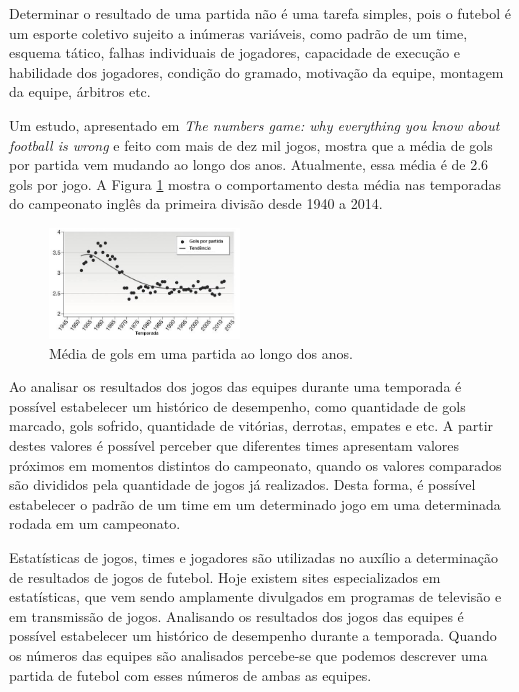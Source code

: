 \documentclass{article}
\begin{document}
Determinar o resultado de uma partida não é uma tarefa
simples, pois o futebol é um esporte coletivo sujeito a inúmeras
variáveis, como padrão de um time, esquema tático, falhas
individuais de jogadores, capacidade de execução e habilidade
dos jogadores, condição do gramado, motivação da equipe,
montagem da equipe, árbitros  etc. 

Um estudo, apresentado em \textit{ The numbers game: why
everything you know about football is wrong} \cite{anderson2013numbers} e feito com
mais de dez mil jogos, mostra que a média de gols por partida
vem mudando ao longo dos anos. Atualmente, essa média é
de 2.6 gols por jogo. A Figura \ref{fig:gols_ingles} mostra o comportamento desta média nas temporadas do campeonato inglês da primeira divisão desde 1940 a 2014.

\begin{figure}[!h]
	\centering
	\includegraphics[width=0.45\textwidth]{./04-figuras/ingles_gols_2.png}
	\caption{Média de gols em uma partida ao longo dos anos.}
	\label{fig:gols_ingles}
\end{figure}





Ao analisar os resultados dos jogos das equipes durante
uma temporada é possível estabelecer um histórico de desempenho, como quantidade de gols marcado, gols sofrido, quantidade de vitórias, derrotas, empates e etc. A partir destes valores é possível perceber que diferentes times apresentam valores próximos em momentos distintos do campeonato, quando os valores comparados são divididos pela quantidade de jogos já realizados. Desta forma, é possível estabelecer o padrão de um
time em um determinado jogo em uma determinada rodada em
um campeonato.

Estatísticas de jogos, times e jogadores são utilizadas no auxílio a determinação
de resultados de jogos de futebol. Hoje existem sites especializados em estatísticas,
que vem sendo amplamente divulgados em programas de televisão e em transmissão
de jogos. Analisando os resultados dos jogos das equipes é possível estabelecer um
histórico de desempenho durante a temporada. Quando os números das equipes são analisados percebe-se que podemos descrever uma partida de futebol com esses números de ambas as equipes.
\end{document}
